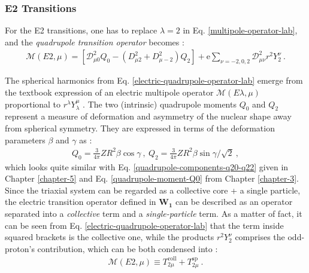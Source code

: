 \subsubsection{E2 Transitions}

For the E2 transitions, one has to replace $\lambda=2$ in Eq. \ref{multipole-operator-lab}, and the \emph{quadrupole transition operator} becomes \cite{toki1975asymmetric,raduta2020towards}:
\begin{align}
    \mathcal{M}(E2,\mu)=\left[\mathcal{D}_{\mu0}^2Q_0-\left(D_{\mu 2}^2+D_{\mu -2}^2\right)Q_2\right]+\mathrm{e}\sum_{\nu=-2,0,2}\mathcal{D}_{\mu\nu}^2r^2Y_2^\nu\ .
    \label{electric-quadrupole-operator-lab}
\end{align}

The spherical harmonics from Eq. \ref{electric-quadrupole-operator-lab} emerge from the textbook expression of an electric multipole operator $\mathcal{M}(E\lambda,\mu)$ proportional to $r^\lambda Y_\lambda^\mu$  \cite{heyde1994nuclear}. The two (intrinsic) quadrupole moments $Q_{0}$ and $Q_{2}$ represent a measure of deformation and asymmetry of the nuclear shape away from spherical symmetry. They are expressed in terms of the deformation parameters $\beta$ and $\gamma$ as \cite{raduta2018wobbling}:
\begin{align}
    Q_{0}=\frac{3}{4\pi}ZR^2\beta\cos\gamma\ ,\ Q_{2}=\frac{3}{4\pi}ZR^2\beta\sin\gamma/\sqrt{2}\ ,
    \label{quadrupole-components-Q0-Q2}
\end{align}
which looks quite similar with Eq. \ref{quadrupole-components-q20-q22} given in Chapter \ref{chapter-5} and Eq. \ref{quadrupole-moment-Q0} from Chapter \ref{chapter-3}. Since the triaxial system can be regarded as a collective core + a single particle, the electric transition operator defined in $\mathbf{W_1}$ can be described as an operator separated into a \emph{collective} term and a \emph{single-particle} term. As a matter of fact, it can be seen from Eq. \ref{electric-quadrupole-operator-lab} that the term inside squared brackets is the collective one, while the products $r^2Y_2^\nu$ comprises the odd-proton's contribution, which can be both condensed into \cite{raduta2020approach}:
\begin{align}
    \mathcal{M}(E2,\mu)\equiv T_{2\mu}^\text{coll}+T_{2\mu}^\text{sp}\ .
    \label{quadrupole-transition-operator-terms}
\end{align}


